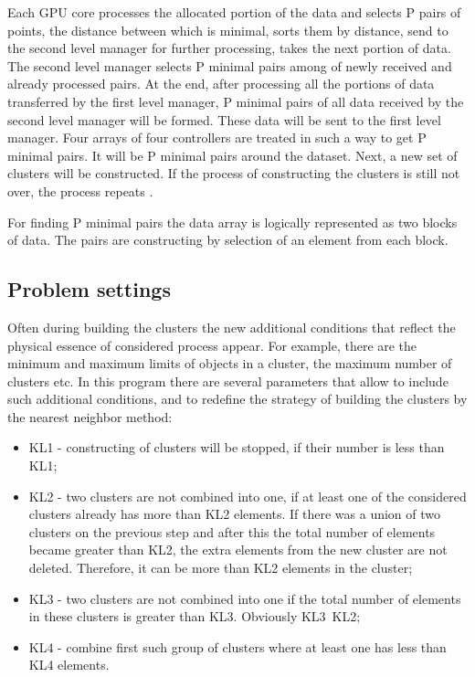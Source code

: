 \documentclass{TAACpaper}
\begin{document}
Each GPU core processes the allocated portion of the data and selects P pairs of points, the distance between which is minimal, sorts them by distance, send to the second level manager for further processing, takes the next portion of data. The second level manager selects P minimal pairs among of newly received and already processed pairs. At the end, after processing all the portions of data transferred by the first level manager, P minimal pairs of all data received by the second level manager will be formed. These data will be sent to the first level manager. Four arrays of four controllers are treated in such a way to get P minimal pairs. It will be P minimal pairs around the dataset. Next, a new set of clusters will be constructed. If the process of constructing the clusters is still not over, the process repeats \cite{prokhorenok2010VS}. 

For finding P minimal pairs the data array is logically represented as two blocks of data. The pairs are constructing by selection of an element from each block.

\subsection{Problem settings}
Often during building the clusters the new additional conditions that reflect the physical essence of considered process appear. For example, there are the minimum and maximum limits of objects in a cluster, the maximum number of clusters etc. In this program there are several parameters that allow to include such additional conditions, and to redefine the strategy of building the clusters by the nearest neighbor method: 
\begin{itemize}
 \item KL1 - constructing of clusters will be stopped, if their number is less than KL1;
 \item KL2 - two clusters are not combined into one, if at least one of the considered clusters already has more than KL2 elements. If there was a union of two clusters on the previous step and after this the total number of elements became greater than KL2, the extra elements from the new cluster are not deleted. Therefore, it can be more than KL2 elements in the cluster;
 \item  KL3 - two clusters are not combined into one if the total number of elements in these clusters is greater than KL3. Obviously KL3~KL2;
 \item KL4 - combine first such group of clusters where at least one has less than KL4 elements.
\end{itemize}
\end{document}
